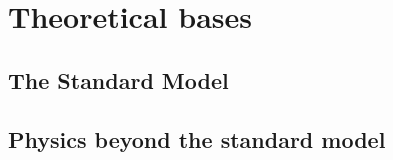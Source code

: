 
%
%

\chapter{Theoretical bases}
\label{chap:theory}

\section{The Standard Model }
\label{sec:SM}


\section{Physics beyond the standard model}
\label{sec:BSM}

